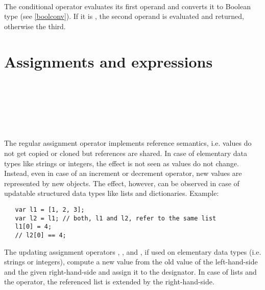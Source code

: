 \begin{grammar}
      \produces {} \\
      \produces {} 
          \lextoken{:}
\end{grammar}

\noindent
The conditional operator  evaluates its first operand
and converts it to Boolean type (see \ref{boolconv}). If it
is , the second operand is evaluated and returned,
otherwise the third.

\section{Assignments and expressions}\label{assignments}

\begin{grammar}
      \produces {} \\
      \produces {} \lextoken{=}
          \\
      \produces {} \lextoken{\&=}
          \\
      \produces {} \lextoken{+=}
          \\
      \produces {} \lextoken{$-$=}
          \\
      \produces {}
\end{grammar}

\noindent
The regular assignment operator \token{=} implements reference semantics,
i.e. values do not get copied or cloned but references are shared. In
case of elementary data types like strings or integers, the effect is
not seen as values do not change. Instead, even in case of an increment
or decrement operator, new values are represented by new objects. The
effect, however, can be observed in case of updatable structured data types
like lists and dictionaries. Example:

\begin{lstlisting}
   var l1 = [1, 2, 3];
   var l2 = l1; // both, l1 and l2, refer to the same list
   l1[0] = 4;
   // l2[0] == 4;
\end{lstlisting}

\noindent
The updating assignment operators \token{\&=}, \token{+=}, and \token{-=},
if used on elementary data types (i.e. strings or integers),
compute a new value from the old value of the left-hand-side
and the given right-hand-side and assign it to the designator.
In case of lists and the \token{\&=} operator, the referenced list
is extended by the right-hand-side.

